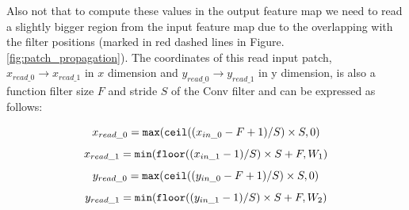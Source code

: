 \documentclass[10, sigconf]{acmart}
\begin{document}
\vspace{0.2in}

Also not that to compute these values in the output feature map we need to read a slightly bigger region from the input feature map due to the overlapping with the filter positions (marked in red dashed lines in Figure. \ref{fig:patch_propagation}). The coordinates of this read input patch, $x_{read\_0}\rightarrow x_{read\_1}$ in $x$ dimension and $y_{read\_0}\rightarrow y_{read\_1}$ in y dimension, is also a function filter size $F$ and stride $S$ of the Conv filter and can be expressed as follows:

\begin{equation}
x_{read\_0} = \texttt{max}(\texttt{ceil}((x_{in\_0} - F + 1)/S) \times S, 0) \\
\end{equation}
\begin{equation}
x_{read\_1} = \texttt{min}(\texttt{floor}((x_{in\_1} - 1)/S) \times S + F, W_1)\\
\end{equation}
\begin{equation}
y_{read\_0} = \texttt{max}(\texttt{ceil}((y_{in\_0} - F + 1)/S) \times S, 0) \\
\end{equation}
\begin{equation}
y_{read\_1} = \texttt{min}(\texttt{floor}((y_{in\_1} - 1)/S) \times S + F, W_2)\\
\end{equation}

\vspace{0.2in}
\end{document}
